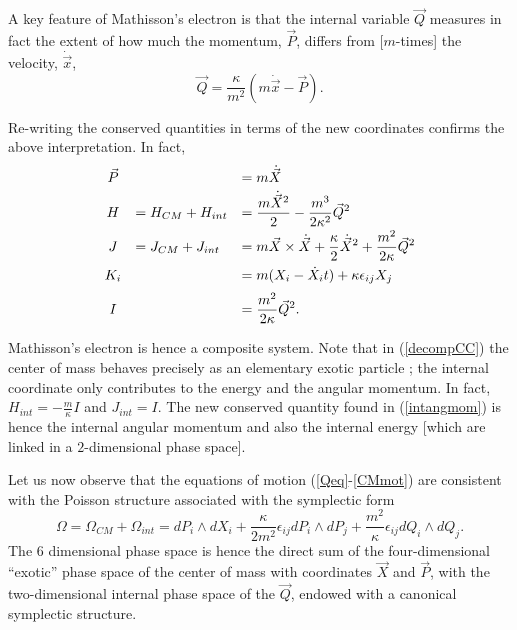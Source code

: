 \documentclass[a4paper,11pt]{article}
\newcommand{\vx}{{\vec x}}
\def\vP{{\vec P}}
\def\vQ{{\vec Q}}
\def\vx{{\vec x}}
\def\vX{{\vec X}}
\begin{document}
A key feature of Mathisson's electron is that
  the internal variable
$\vQ$ measures in fact the extent of how much
the momentum, $\vP$, differs from [$m$-times] the velocity, $\dot{\vx}$,
\begin{equation}
     \vQ=\frac{\kappa}{m^2}(m\dot{\vx}-\vP).
     \label{velmom}
\end{equation}

Re-writing the conserved quantities in terms of the new
coordinates confirms the above interpretation. In fact,
\begin{equation}
     \begin{array}{ccc}
	\vP&&=m\dot{\vX}\hfill
	\\[3pt]
	H&=H_{CM}+H_{int}\hfill&=
	\displaystyle\frac{m\dot{\vX}^2}{2}-
	\displaystyle\frac{m^3}{2\kappa^2}\vQ^2\hfill
	\\[6pt]
	J&=J_{CM}+J_{int}\hfill&=
	m\vX\times\dot{\vX}+\displaystyle\frac{\kappa}{2}\dot{\vX}^2+
	\displaystyle\frac{m^2}{2\kappa}\vQ^2\hfill
	\\[8pt]
	K_{i}&&=m(X_{i}-\dot{X}_{i}t)+\kappa\epsilon_{ij}X_{j}\hfill
	\\[6pt]
	I&&=\displaystyle\frac{m^2}{2\kappa}\vQ^2.\hfill
     \end{array}
     \label{decompCC}
\end{equation}


Mathisson's electron  is hence a composite system.
Note that in (\ref{decompCC}) the center of mass
behaves precisely as an
elementary exotic particle \cite{DH};
the internal coordinate only contributes to the energy
and the angular momentum. In fact,
$H_{int}=-\displaystyle\frac{m}{\kappa}I$
and $J_{int}=I$.
The  new conserved quantity found in (\ref{intangmom}) is hence
the internal angular momentum and also the internal energy
[which are linked in a $2$-dimensional phase space].

Let us now observe that the equations of motion (\ref{Qeq}-\ref{CMmot})
are consistent with the Poisson structure associated with the
symplectic form
\begin{equation}
     \Omega=\Omega_{CM}+\Omega_{int}=
     dP_{i}\wedge dX_{i}
     +\frac{\kappa}{2m^2}\epsilon_{ij}dP_{i}\wedge dP_{j}
     +\frac{m^2}{\kappa}\epsilon_{ij}
     dQ_{i}\wedge dQ_{j}.
     \label{sympstr}
\end{equation}
The $6$ dimensional phase space is hence the direct sum
of the four-dimensional ``exotic'' phase space
of the center of mass with coordinates $\vX$ and $\vP$,
with the two-dimensional internal phase space of the
$\vQ$, endowed with a canonical symplectic structure.
\end{document}
